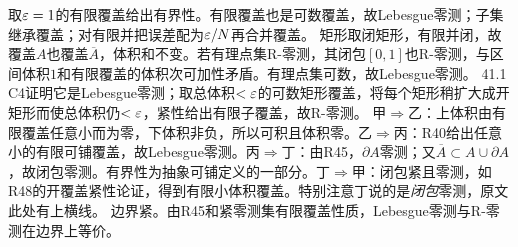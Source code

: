 \documentclass[UTF8,fontset=fandol,11pt]{ctexart}
\begin{document}
取$\varepsilon=1$的有限覆盖给出有界性。有限覆盖也是可数覆盖，故Lebesgue零测；子集继承覆盖；对有限并把误差配为$\varepsilon/N$再合并覆盖。
矩形取闭矩形，有限并闭，故覆盖$A$也覆盖$\overline A$，体积和不变。若有理点集R-零测，其闭包$[0,1]$也R-零测，与区间体积$1$和有限覆盖的体积次可加性矛盾。有理点集可数，故Lebesgue零测。
41.1 C4证明它是Lebesgue零测；取总体积$<\varepsilon$的可数矩形覆盖，将每个矩形稍扩大成开矩形而使总体积仍$<\varepsilon$，紧性给出有限子覆盖，故R-零测。
甲$\Rightarrow$乙：上体积由有限覆盖任意小而为零，下体积非负，所以可积且体积零。乙$\Rightarrow$丙：R40给出任意小的有限可铺覆盖，故Lebesgue零测。丙$\Rightarrow$丁：由R45，$\partial A$零测；又$\overline A\subset A\cup\partial A$，故闭包零测。有界性为抽象可铺定义的一部分。丁$\Rightarrow$甲：闭包紧且零测，如R48的开覆盖紧性论证，得到有限小体积覆盖。特别注意丁说的是\emph{闭包}零测，原文此处有上横线。
边界紧。由R45和紧零测集有限覆盖性质，Lebesgue零测与R-零测在边界上等价。
\originalpages
\end{document}
